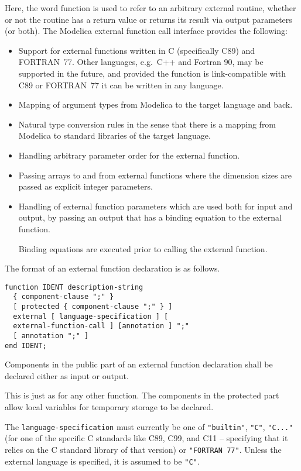 Here, the word function is used to refer to an arbitrary external
routine, whether or not the routine has a return value or returns its
result via output parameters (or both). The Modelica external function
call interface provides the following:
\begin{itemize}
\item
  Support for external functions written in C (specifically C89) and
  FORTRAN~77. Other languages, e.g.\ C++ and Fortran 90, may be supported
  in the future, and provided the function is link-compatible with C89
  or FORTRAN~77 it can be written in any language.
\item
  Mapping of argument types from Modelica to the target language and
  back.
\item
  Natural type conversion rules in the sense that there is a mapping
  from Modelica to standard libraries of the target language.
\item
  Handling arbitrary parameter order for the external function.
\item
  Passing arrays to and from external functions where the dimension
  sizes are passed as explicit integer parameters.
\item
  Handling of external function parameters which are used both for input
  and output, by passing an output that has a binding equation to
  the external function.
  \begin{nonnormative}
  Binding equations are executed prior to calling the external function.
  \end{nonnormative}
\end{itemize}

The format of an external function declaration is as follows.
\begin{lstlisting}[language=grammar]
function IDENT description-string
  { component-clause ";" }
  [ protected { component-clause ";" } ]
  external [ language-specification ] [
  external-function-call ] [annotation ] ";"
  [ annotation ";" ]
end IDENT;
\end{lstlisting}

Components in the public part of an external function declaration shall
be declared either as input or output.

\begin{nonnormative}
This is just as for any other function.  The components in the protected part allow local variables for temporary storage to be declared.
\end{nonnormative}

The \lstinline!language-specification! must currently be one of \lstinline!"builtin"!, \lstinline!"C"!, \lstinline!"C..."! (for one of the specific C standards like C89, C99, and C11 -- specifying
that it relies on the C standard library of that version) or \lstinline!"FORTRAN 77"!.  Unless the external language is specified, it is assumed to be \lstinline!"C"!.

